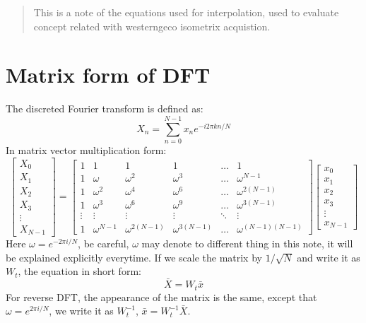 \documentclass[12pt]{article}
\begin{document}
\maketitle

\begin{abstract}
This is a note of the equations used for interpolation,
    used to evaluate concept related with westerngeco isometrix acquistion.
\end{abstract}

\section{Matrix form of DFT}
The discreted Fourier transform is defined as:
\begin{equation}
    X_n = \sum_{n=0}^{N-1} x_n e ^ {-i2\pi kn/N}
\end{equation}
In matrix vector multiplication form:
\begin{equation}
\begin{bmatrix}
    X_0 \\ X_1 \\ X_2 \\ X_3 \\ \vdots \\ X_{N-1} 
\end{bmatrix}
=
    \begin{bmatrix}
        1 & 1 & 1 & 1 & \ldots & 1 \\
        1 & \omega & \omega^2 & \omega^3 & \ldots & \omega^{N-1} \\
        1 & \omega^2 & \omega^4 & \omega^6 & \ldots & \omega^{2(N-1)} \\
        1 & \omega^3 & \omega^6 & \omega^9 & \ldots & \omega^{3(N-1)} \\
        \vdots & \vdots & \vdots & \vdots & \ddots & \vdots \\
        1 & \omega^{N-1} & \omega^{2(N-1)} & \omega^{3(N-1)} & \ldots & \omega^{(N-1)(N-1)} 
    \end{bmatrix}
    \begin{bmatrix}
        x_0 \\ x_1 \\ x_2 \\ x_3 \\ \vdots \\ x_{N-1}
    \end{bmatrix}
\end{equation}
Here $\omega=e^{-2\pi i/N}$, be careful, $\omega$ may denote to different thing in this note,
it will be explained explicitly everytime.
If we scale the matrix by $1/\sqrt{N}$ and write it as $W_t$, the equation in short form:
\begin{equation}
    \bar{X} = W_t\bar{x}
\end{equation}
For reverse DFT, the appearance of the matrix is the same, except that $\omega=e^{2\pi i/N}$, 
we write it as $W_t^{-1}$, $\bar{x} = W_t^{-1}\bar{X}$.
\end{document}
